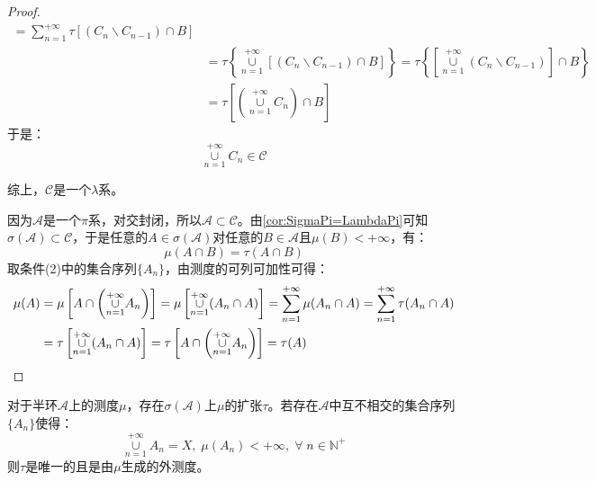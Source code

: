 \begin{proof}
\begin{align*}
		=\sum_{n=1}^{+\infty}\tau[(C_n\backslash C_{n-1})\cap B] \\
		&=\tau\left\{\underset{n=1}{\overset{+\infty}{\cup}}[(C_n\backslash C_{n-1})\cap B]\right\}
		=\tau\left\{\left[\underset{n=1}{\overset{+\infty}{\cup}}(C_n\backslash C_{n-1})\right]\cap B\right\} \\
		&=\tau\left[\left(\underset{n=1}{\overset{+\infty}{\cup}}C_n\right)\cap B\right]
	\end{align*}
	于是：
	\begin{equation*}
		\underset{n=1}{\overset{+\infty}{\cup}}C_n\in \mathscr{C}
	\end{equation*}\par
	综上，$\mathscr{C}$是一个$\lambda$系。\par
	因为$\mathscr{A}$是一个$\pi$系，对交封闭，所以$\mathscr{A}\subset \mathscr{C}$。由\cref{cor:SigmaPi=LambdaPi}可知$\sigma(\mathscr{A})\subset \mathscr{C}$，于是任意的$A\in\sigma(\mathscr{A})$对任意的$B\in \mathscr{A}$且$\mu(B)<+\infty$，有：
	\begin{equation*}
		\mu(A\cap B)=\tau(A\cap B)
	\end{equation*}
	取条件(2)中的集合序列$\{A_n\}$，由测度的可列可加性可得：
	\begin{align*}
		\mu(A)&=\mu\left[A\cap\left(\underset{n=1}{\overset{+\infty}{\cup}}A_n\right)\right]
		=\mu\left[\underset{n=1}{\overset{+\infty}{\cup}}(A_n\cap A)\right]
		=\sum_{n=1}^{+\infty}\mu(A_n\cap A)=\sum_{n=1}^{+\infty}\tau(A_n\cap A) \\
		&=\tau\left[\underset{n=1}{\overset{+\infty}{\cup}}(A_n\cap A)\right]
		=\tau\left[A\cap\left(\underset{n=1}{\overset{+\infty}{\cup}}A_n\right)\right]
		=\tau(A)\qedhere
	\end{align*}
\end{proof}
\begin{theorem}
	对于半环$\mathscr{A}$上的测度$\mu$，存在$\sigma(\mathscr{A})$上$\mu$的扩张$\tau$。若存在$\mathscr{A}$中互不相交的集合序列$\{A_n\}$使得：
	\begin{equation*}
		\underset{n=1}{\overset{+\infty}{\cup}}A_n=X,\;\mu(A_n)<+\infty,\;\forall\;n\in\mathbb{N}^+
	\end{equation*}
	则$\tau$是唯一的且是由$\mu$生成的外测度。
\end{theorem}
